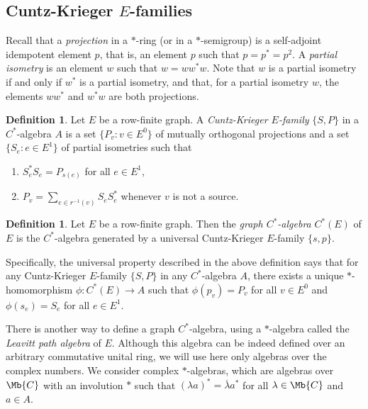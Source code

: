 \documentclass[11pt]{amsart}
\def\C{\mathbb{C}}  \def\Q{\mathbb{Q}}  \def\R{\mathbb{R}}
\def\ol{\overline}
\def\C{\Mb{C}}
\theoremstyle{plain}            %
\theoremstyle{definition}       %
\newtheorem{definition}[theorem]{Definition}
\theoremstyle{definition}       %
\theoremstyle{remark}
\def\C{\mathbb{C}}  \def\Q{\mathbb{Q}}  \def\R{\mathbb{R}}
\def\C{\Mb{C}}
\def\R{\Mb{R}}
\def\C{\Mb{C}}
\def\R{\Mb{R}}
\begin{document}
\subsection{Cuntz-Krieger $E$-families}

Recall that a {\it projection} in a $*$-ring (or in a $*$-semigroup) is a self-adjoint idempotent element $p$, that is, an element $p$ such that $p=p^*= p^2$. A {\it partial isometry} is an element $w$ such that
$w= ww^*w$. Note that $w$ is a partial isometry if and only if $w^*$ is a partial isometry, and that, for a partial isometry $w$, the elements $ww^*$ and $w^*w$ are both projections. 

\medskip
  
\begin{definition}
Let $E$ be a row-finite graph. A {\it Cuntz-Krieger $E$-family} $\{S,P\}$ in a $C^*$-algebra $A$ is a set $\{ P_v : v\in E^0\}$ of mutually orthogonal projections and a set $\{S_e: e\in E^1\}$ of partial isometries such that 
  \begin{enumerate}
  	\item[(CK1)] $S_e^*S_e = P_{s(e)}$ for all $e\in E^1$,
  	\item[(CK2)] $P_v = \sum_{e\in r^{-1} (v)} S_eS_e^*$ whenever $v$ is not a source.  
  \end{enumerate}
\end{definition}
  
  \begin{definition}
  	\label{def:graphCalg}
 Let $E$ be a row-finite graph. Then the {\it graph $C^*$-algebra} $C^*(E)$ of $E$ is the $C^*$-algebra generated by a universal Cuntz-Krieger $E$-family $\{s,p\}$.    	
  	\end{definition}
  
  Specifically, the universal property described in the above definition says that for any Cuntz-Krieger $E$-family $\{S,P\}$ in any $C^*$-algebra $A$, there exists a unique $*$-homomorphism $\phi\colon C^*(E)\to A$ such that $\phi (p_v)= P_v$ for all $v \in E^0$ and $\phi (s_e)= S_e$ for all $e\in E^1$.  
  
  There is another way to define a graph $C^*$-algebra, using a $*$-algebra called the {\it Leavitt path algebra}
  of $E$. Although this algebra can be indeed defined over an arbitrary commutative unital ring, we will use here only algebras over the complex numbers. We consider complex $*$-algebras, which are algebras over $\C$ with an involution $*$ such that $(\lambda a)^* = \ol{\lambda}a^*$ for all $\lambda\in \C$ and $a\in A$.  
   
\end{document}
